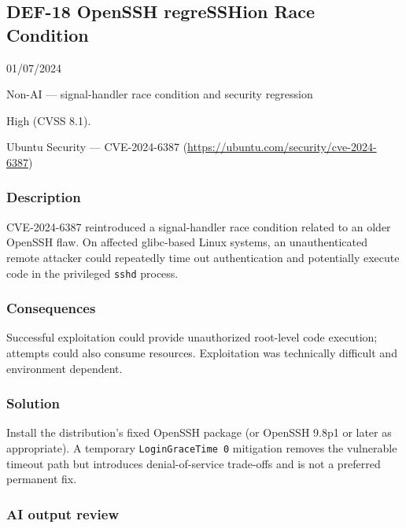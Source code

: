 \subsection{DEF-18 OpenSSH regreSSHion Race Condition}

\begin{description}[style=nextline,leftmargin=3.2cm]

\item[Publicized] 01/07/2024

\item[Category] Non-AI — signal-handler race condition and security regression

\item[Severity] High (CVSS 8.1).

\item[Source] Ubuntu Security — CVE-2024-6387 (\url{https://ubuntu.com/security/cve-2024-6387})

\end{description}

\subsubsection{Description}

CVE-2024-6387 reintroduced a signal-handler race condition related to an older OpenSSH flaw. On affected glibc-based Linux systems, an unauthenticated remote attacker could repeatedly time out authentication and potentially execute code in the privileged \texttt{sshd} process.

\subsubsection{Consequences}

Successful exploitation could provide unauthorized root-level code execution; attempts could also consume resources. Exploitation was technically difficult and environment dependent.

\subsubsection{Solution}

Install the distribution's fixed OpenSSH package (or OpenSSH 9.8p1 or later as appropriate). A temporary \texttt{LoginGraceTime 0} mitigation removes the vulnerable timeout path but introduces denial-of-service trade-offs and is not a preferred permanent fix.

\subsubsection{AI output review}

